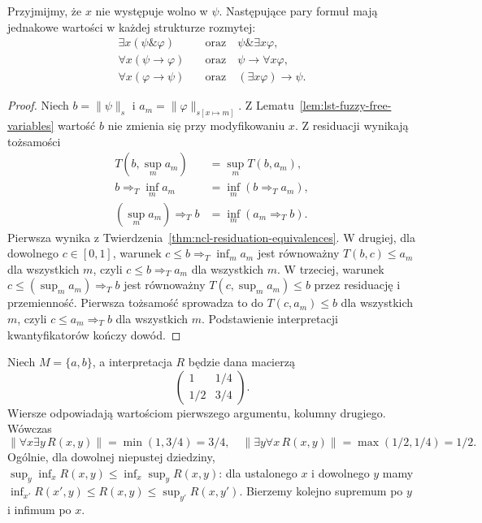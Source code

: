 \begin{stwierdzenie}
\label{prop:lst-fuzzy-quantifier-laws}
Przyjmijmy, że $x$ nie występuje wolno w $\psi$.
Następujące pary formuł mają jednakowe wartości
w każdej strukturze rozmytej:
\begin{align*}
 \exists x(\psi\mathbin{\&}\varphi)
 &\quad\text{oraz}\quad \psi\mathbin{\&}\exists x\varphi,\\
 \forall x(\psi\to\varphi)
 &\quad\text{oraz}\quad \psi\to\forall x\varphi,\\
 \forall x(\varphi\to\psi)
 &\quad\text{oraz}\quad (\exists x\varphi)\to\psi.
\end{align*}
\end{stwierdzenie}
\begin{proof}
Niech $b=\|\psi\|_s$ i $a_m=\|\varphi\|_{s[x\mapsto m]}$.
Z Lematu~\ref{lem:lst-fuzzy-free-variables} wartość $b$
nie zmienia się przy modyfikowaniu $x$. Z residuacji
wynikają tożsamości
\[
\begin{split}
 T(b,\sup_m a_m)&=\sup_m T(b,a_m),\\
 b\Rightarrow_T\inf_m a_m&=\inf_m(b\Rightarrow_T a_m),\\
 (\sup_m a_m)\Rightarrow_T b&=\inf_m(a_m\Rightarrow_T b).
\end{split}
\]
Pierwsza wynika z
Twierdzenia~\ref{thm:ncl-residuation-equivalences}.
W drugiej, dla dowolnego $c\in[0,1]$, warunek
$c\leq b\Rightarrow_T\inf_m a_m$ jest równoważny
$T(b,c)\leq a_m$ dla wszystkich $m$, czyli
$c\leq b\Rightarrow_T a_m$ dla wszystkich $m$.
W trzeciej, warunek
$c\leq(\sup_m a_m)\Rightarrow_T b$ jest równoważny
$T(c,\sup_m a_m)\leq b$ przez residuację i przemienność.
Pierwsza tożsamość sprowadza to do $T(c,a_m)\leq b$
dla wszystkich $m$, czyli $c\leq a_m\Rightarrow_T b$
dla wszystkich $m$. Podstawienie interpretacji
kwantyfikatorów kończy dowód.
\end{proof}

\begin{przyklad}
\label{ex:lst-fuzzy-quantifier-order}
Niech $M=\{a,b\}$, a interpretacja $R$ będzie dana macierzą
\[
 \begin{pmatrix}
 1 & 1/4\\
 1/2 & 3/4
 \end{pmatrix}.
\]
Wiersze odpowiadają wartościom pierwszego argumentu,
kolumny drugiego. Wówczas
\[
 \|\forall x\exists y\,R(x,y)\|=\min(1,3/4)=3/4,
 \quad
 \|\exists y\forall x\,R(x,y)\|=\max(1/2,1/4)=1/2.
\]
Ogólnie, dla dowolnej niepustej dziedziny,
$\sup_y\inf_x R(x,y)\leq\inf_x\sup_y R(x,y)$:
dla ustalonego $x$ i dowolnego $y$ mamy
$\inf_{x'}R(x',y)\leq R(x,y)\leq\sup_{y'}R(x,y')$.
Bierzemy kolejno supremum po $y$ i infimum po $x$.
\end{przyklad}

